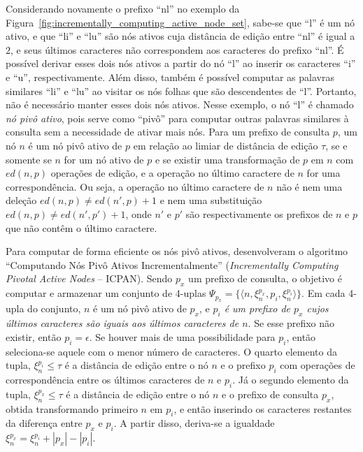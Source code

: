 Considerando novamente o prefixo ``nl'' no exemplo da Figura~\ref{fig:incrementally_computing_active_node_set}, sabe-se que ``l'' é um nó ativo, e que ``li'' e ``lu'' são nós ativos cuja distância de edição entre ``nl'' é igual a $2$, e seus últimos caracteres não correspondem aos caracteres do prefixo ``nl''. É possível derivar esses dois nós ativos a partir do nó ``l'' ao inserir os caracteres ``i'' e ``u'', respectivamente. Além disso, também é possível computar as palavras similares ``li'' e ``lu'' ao visitar os nós folhas que são descendentes de ``l''. Portanto, não é necessário manter esses dois nós ativos. Nesse exemplo, o nó ``l'' é chamado \textit{nó pivô ativo}, pois serve como ``pivô'' para computar outras palavras similares à consulta sem a necessidade de ativar mais nós. Para um prefixo de consulta $p$, um nó $n$ é um nó pivô ativo de $p$ em relação ao limiar de distância de edição $\tau$, se e somente se $n$ for um nó ativo de $p$ e se existir uma transformação de $p$ em $n$ com $ed(n,p)$ operações de edição, e a operação no último caractere de $n$ for uma correspondência. Ou seja, a operação no último caractere de $n$ não é nem uma deleção $ed(n,p) \neq ed(n', p) + 1$ e nem uma substituição $ed(n,p) \neq ed(n', p') + 1$, onde $n'$ e $p'$ são respectivamente os prefixos de $n$ e $p$ que não contêm o último caractere. 

Para computar de forma eficiente os nós pivô ativos, \cite{li2011efficient} desenvolveram o algoritmo ``Computando Nós Pivô Ativos Incrementalmente'' (\textit{Incrementally Computing Pivotal Active Nodes } -- ICPAN). Sendo $p_{x}$ um prefixo de consulta, o objetivo é computar e armazenar um conjunto de 4-uplas $\Psi_{p_{x}} = \{ \langle n, \xi_{n}^{p_{x}}, p_{i}, \xi_{n}^{p_{i}} \rangle \}$. Em cada 4-upla do conjunto, $n$ é um nó pivô ativo de $p_{x}$, e \textit{$p_{i}$ é um prefixo de $p_{x}$ cujos últimos caracteres são iguais aos últimos caracteres de $n$}. Se esse prefixo não existir, então $p_{i} = \epsilon$. Se houver mais de uma possibilidade para $p_{i}$, então seleciona-se aquele com o menor número de caracteres. O quarto elemento da tupla, $\xi_{n}^{p_{i}} \leq \tau$ é a distância de edição entre o nó $n$ e o prefixo $p_{i}$ com operações de correspondência entre os últimos caracteres de $n$ e $p_{i}$. Já o segundo elemento da tupla, $\xi_{n}^{p_{x}} \leq \tau$ é a distância de edição entre o nó $n$ e o prefixo de consulta $p_{x}$, obtida transformando primeiro $n$ em $p_{i}$, e então inserindo os caracteres restantes da diferença entre $p_{x}$ e $p_{i}$. A partir disso, deriva-se a igualdade $\xi_{n}^{p_{x}}=\xi_{n}^{p_{i}} + |p_{x}|-|p_{i}|$.

